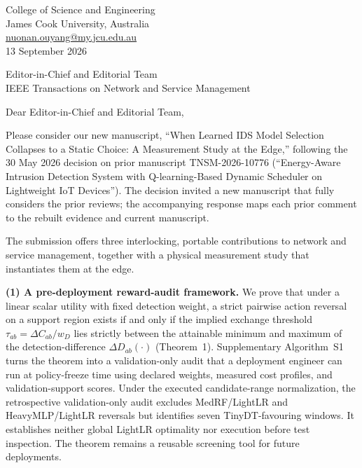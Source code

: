 \documentclass[11pt]{article}
\begin{document}
\thispagestyle{empty}

\begin{flushright}
College of Science and Engineering\\
James Cook University, Australia\\
\href{mailto:nuonan.ouyang@my.jcu.edu.au}{nuonan.ouyang@my.jcu.edu.au}\\
13 September 2026
\end{flushright}

\vspace{4pt}
Editor-in-Chief and Editorial Team\\
IEEE Transactions on Network and Service Management

\vspace{6pt}
Dear Editor-in-Chief and Editorial Team,

Please consider our new manuscript, ``When Learned IDS Model Selection Collapses to a Static Choice: A Measurement Study at the Edge,'' following the 30 May 2026 decision on prior manuscript TNSM-2026-10776 (``Energy-Aware Intrusion Detection System with Q-learning-Based Dynamic Scheduler on Lightweight IoT Devices''). The decision invited a new manuscript that fully considers the prior reviews; the accompanying response maps each prior comment to the rebuilt evidence and current manuscript.

The submission offers three interlocking, portable contributions to network and service management, together with a physical measurement study that instantiates them at the edge.

\textbf{(1) A pre-deployment reward-audit framework.} We prove that under a linear scalar utility with fixed detection weight, a strict pairwise action reversal on a support region exists if and only if the implied exchange threshold $\tau_{ab}=\Delta C_{ab}/w_D$ lies strictly between the attainable minimum and maximum of the detection-difference $\Delta D_{ab}(\cdot)$ (Theorem~1). Supplementary Algorithm~S1 turns the theorem into a validation-only audit that a deployment engineer can run at policy-freeze time using declared weights, measured cost profiles, and validation-support scores. Under the executed candidate-range normalization, the retrospective validation-only audit excludes MedRF/LightLR and HeavyMLP/LightLR reversals but identifies seven TinyDT-favouring windows. It establishes neither global LightLR optimality nor execution before test inspection. The theorem remains a reusable screening tool for future deployments.
\end{document}

